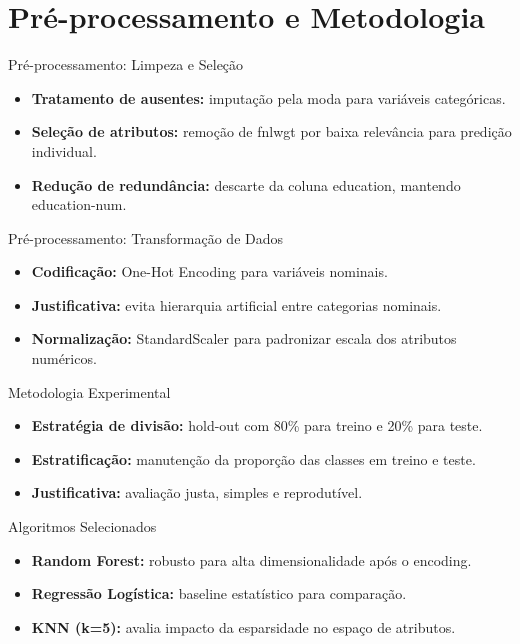 
\section{Pré-processamento e Metodologia}

\begin{slide}{Pré-processamento: Limpeza e Seleção}
  \begin{itemize}
    \item \textbf{Tratamento de ausentes:} imputação pela moda para variáveis categóricas.
    \item \textbf{Seleção de atributos:} remoção de fnlwgt por baixa relevância para predição individual.
    \item \textbf{Redução de redundância:} descarte da coluna education, mantendo education-num.
  \end{itemize}
\end{slide}

\begin{slide}{Pré-processamento: Transformação de Dados}
  \begin{itemize}
    \item \textbf{Codificação:} One-Hot Encoding para variáveis nominais.
    \item \textbf{Justificativa:} evita hierarquia artificial entre categorias nominais.
    \item \textbf{Normalização:} StandardScaler para padronizar escala dos atributos numéricos.
  \end{itemize}
\end{slide}

\begin{slide}{Metodologia Experimental}
  \begin{itemize}
    \item \textbf{Estratégia de divisão:} hold-out com 80\% para treino e 20\% para teste.
    \item \textbf{Estratificação:} manutenção da proporção das classes em treino e teste.
    \item \textbf{Justificativa:} avaliação justa, simples e reprodutível.
  \end{itemize}
\end{slide}

\begin{slide}{Algoritmos Selecionados}
  \begin{itemize}
    \item \textbf{Random Forest:} robusto para alta dimensionalidade após o encoding.
    \item \textbf{Regressão Logística:} baseline estatístico para comparação.
    \item \textbf{KNN (k=5):} avalia impacto da esparsidade no espaço de atributos.
  \end{itemize}
\end{slide}

